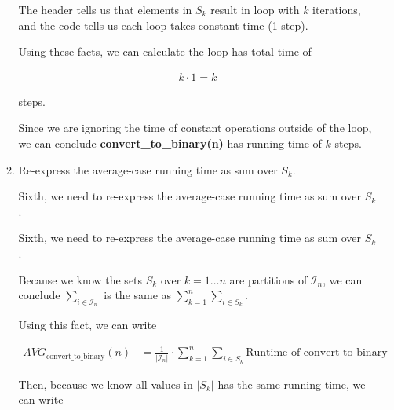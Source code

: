 \documentclass[12pt]{article}
\begin{document}
\begin{enumerate}[a.]
\begin{mdframed}
\begin{enumerate}[1.]
\begin{mdframed}
        \bigskip

        The header tells us that elements in $S_k$ result in loop with $k$ iterations, and
        the code tells us each loop takes constant time (1 step).

        \bigskip

        Using these facts, we can calculate the loop has total time of

        \begin{align}
            k \cdot 1 = k
        \end{align}

        steps.

        \bigskip

        Since we are ignoring the time of constant operations outside of the loop,
        we can conclude \textbf{convert\_to\_binary(n)} has running time of $k$ steps.

        \end{mdframed}

        \item Re-express the average-case running time as sum over $S_k$.

        \bigskip

        Sixth, we need to re-express the average-case running time as sum over $S_k$.

        \bigskip

        \begin{mdframed}

            Sixth, we need to re-express the average-case running time as sum over $S_k$.

            \bigskip

            Because we know the sets $S_k$ over $k = 1 \dots n$ are partitions of
            $\mathcal{I}_n$, we can conclude $\sum\limits_{i \in \mathcal{I}_n}$
            is the same as $\sum\limits_{k = 1}^n \sum\limits_{i \in S_k}$.

            \bigskip

            Using this fact, we can write

            \begin{align}
                AVG_{\text{convert\_to\_binary}}(n) &= \frac{1}{\lvert \mathcal{I}_n \rvert} \cdot \sum\limits_{k = 1}^n \sum\limits_{i \in S_k} \text{Runtime of convert\_to\_binary}
            \end{align}

            \bigskip

            Then, because we know all values in $\lvert S_k \rvert$ has the same
            running time, we can write


\end{mdframed}
\end{enumerate}
\end{mdframed}
\end{enumerate}
\end{document}
